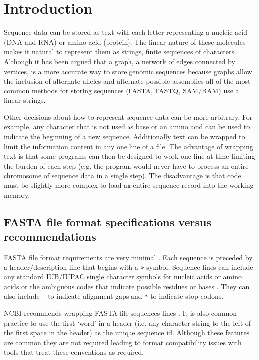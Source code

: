 \section{Introduction}

Sequence data can be stored as text with each letter representing a nucleic acid (DNA and RNA) or amino acid (protein). The linear nature of these molecules makes it natural to represent them as strings, finite sequences of characters. Although it has been argued that a graph, a network of edges connected by vertices, is a more accurate way to store genomic sequences because graphs allow the inclusion of alternate alleles and alternate possible assemblies \cite{jaffe2012fastg} all of the most common methods for storing sequences (FASTA, FASTQ, SAM/BAM) use a linear strings.

Other decisions about how to represent sequence data can be more arbitrary. For example, any character that is not used as base or an amino acid can be used to indicate the beginning of a new sequence. Additionally text can be wrapped to limit the information content in any one line of a file. The advantage of wrapping text is that some programs can then be designed to work one line at time limiting the burden of each step (e.g. the program would never have to process an entire chromosome of sequence data in a single step). The disadvantage is that code must be slightly more complex to load an entire sequence record into the working memory.

\subsection{FASTA file format specifications versus recommendations}

FASTA file format requirements are very minimal \cite{FASTAformat}. Each sequence is preceded by a header/description line that begins with a \verb|>| symbol. Sequence lines can include any standard IUB/IUPAC single character symbols for nucleic acids or amino acids or the ambiguous codes that indicate possible residues or bases \cite{comm1970abbreviations}. They can also include \verb|-| to indicate alignment gaps and \verb|*| to indicate stop codons. 

NCBI recommends wrapping FASTA file sequences lines \cite{FASTAformat}. It is also common practice to use the first `word' in a header (i.e. any character string to the left of the first space in the header) as the unique sequence id. Although these features are common they are not required leading to format compatibility issues with tools that treat these conventions as required.

